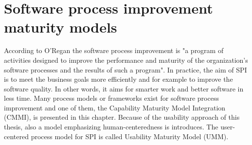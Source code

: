 \documentclass[12pt,a4paper,oneside,pdftex]{report}
\begin{document}

% 

\chapter{Software process improvement maturity models}
\label{chapter:maturitymodels}

According to O'Regan \cite{RefWorks:29} the software process improvement is "a program of activities designed to improve the performance and maturity of the organization's software processes and the results of such a program". In practice, the aim of SPI is to meet the business goals more efficiently and for example to improve the software quality. In other words, it aims for smarter work and better software in less time. Many process models or frameworks exist for software process improvement and one of them, the Capability Maturity Model Integration (CMMI), is presented in this chapter. Because of the usability approach of this thesis, also a model emphasizing human-centeredness is introduces. The user-centered process model for SPI is called Usability Maturity Model (UMM). \cite{RefWorks:29}
\end{document}
